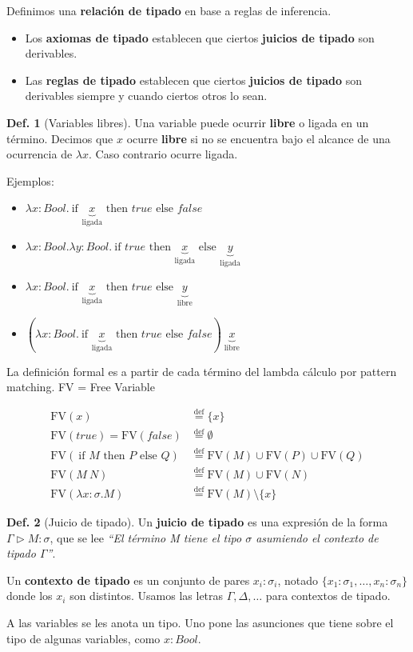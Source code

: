 \documentclass{report}
\theoremstyle{definition} %
\newtheorem{definition}{Def.}[chapter]
\newcommand{\eqdef}{\overset{\text{def}}{=}}
\newcommand{\ifte}[3]{\ \text{if } #1 \text{ then } #2 \text{ else } #3}
\newcommand{\abs}[3]{\lambda #1 : #2 . #3}
\newcommand{\app}[2]{#1 \ #2} %
\newcommand{\tipa}[3]{#1 \rhd #2 : #3} %
\newcommand{\fv}[1]{\text{FV}(#1)} %
\newcommand{\ligada}[1]{\underbrace{#1}_{\text{ligada}}}
\newcommand{\libre}[1]{\underbrace{#1}_{\text{libre}}}
\begin{document}
Definimos una \textbf{relación de tipado} en base a reglas de inferencia.
\begin{itemize}
    \item Los \textbf{axiomas de tipado} establecen que ciertos \textbf{juicios
    de tipado} son derivables.
    \item Las \textbf{reglas de tipado} establecen que ciertos \textbf{juicios
    de tipado} son derivables siempre y cuando ciertos otros lo sean.  
\end{itemize}

\begin{definition}[Variables libres]
Una variable puede ocurrir \textbf{libre} o ligada en un término. Decimos que
$x$ ocurre \textbf{libre} si no se encuentra bajo el alcance de una ocurrencia
de $\lambda x$. Caso contrario ocurre ligada.

Ejemplos:

\begin{itemize}
    \item $\abs
        {x}{Bool}
        {\ifte{\ligada{x}}{true}{false}}$
    \item $\abs
        {x}
        {Bool}
        {\abs{y}{Bool}{\ifte{true}{\ligada{x}}{\ligada{y}}}}$
    \item $\abs{x}{Bool}{\ifte{\ligada{x}}{true}{\libre{y}}}$
    \item $\app{(\abs{x}{Bool}{\ifte{\ligada{x}}{true}{false}})}{\libre{x}}$
\end{itemize}

La definición formal es a partir de cada término del lambda cálculo por pattern
matching. FV = Free Variable

\begin{align*}
    \fv{x} &\eqdef \{ x \} \\
    \fv{true} = \fv{false} &\eqdef \emptyset \\
    \fv{\ifte{M}{P}{Q}} &\eqdef \fv{M} \cup \fv{P} \cup \fv{Q} \\
    \fv{\app{M}{N}} &\eqdef \fv{M} \cup \fv{N} \\
    \fv{\abs{x}{\sigma}{M}} &\eqdef \fv{M} \setminus \{ x \}
\end{align*}
\end{definition}

\begin{definition}[Juicio de tipado]
    Un \textbf{juicio de tipado} es una expresión de la forma
    $\tipa{\Gamma}{M}{\sigma}$, que se lee \textit{``El término M tiene el
    tipo $\sigma$ asumiendo el contexto de tipado $\Gamma$''}.

    Un \textbf{contexto de tipado} es un conjunto de pares $x_i : \sigma_i$,
    notado $\{ x_1 : \sigma_1, \dots, x_n : \sigma_n \}$ donde los $x_i$ son
    distintos. Usamos las letras $\Gamma, \Delta, \dots$ para contextos de
    tipado.

    A las variables se les anota un tipo. Uno pone las asunciones que tiene
    sobre el tipo de algunas variables, como $x : Bool$.
\end{definition}
\end{document}
